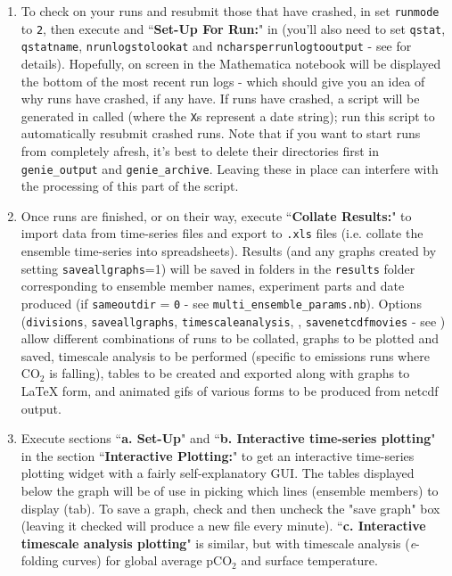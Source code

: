 \documentclass[10pt,a4paper, onecolumn]{article}
\begin{document}
\begin{enumerate}
\item To check on your runs and resubmit those that have crashed, in \texttt{} set \texttt{runmode} to \texttt{2}, then execute \texttt{} and ``\textbf{Set-Up For Run:}" in \texttt{} (you'll also need to set \texttt{qstat}, \texttt{qstatname}, \texttt{nrunlogstolookat} and \texttt{ncharsperrunlogtooutput} - see \texttt{} for details). Hopefully, on screen in the Mathematica notebook will be displayed the bottom of the most recent run logs - which should give you an idea of why runs have crashed, if any have. If runs have crashed, a script will be generated in \texttt{} called \texttt{} (where the \texttt{X}s represent a date string); run this script to automatically resubmit crashed runs. Note that if you want to start runs from completely afresh, it's best to delete their directories first in \texttt{genie\_output} and \texttt{genie\_archive}. Leaving these in place can interfere with the processing of this part of the script.

\item Once runs are finished, or on their way, execute ``\textbf{Collate Results:}"  to import data from time-series files and export to \texttt{.xls} files (i.e. collate the ensemble time-series into spreadsheets). Results (and any graphs created by setting \texttt{saveallgraphs}=1) will be saved in folders in the \texttt{results} folder corresponding to ensemble member names, experiment parts and date produced (if \texttt{sameoutdir} = \texttt{0} - see \texttt{multi\_ensemble\_params.nb}). Options (\texttt{divisions}, \texttt{saveallgraphs}, \texttt{timescaleanalysis}, \texttt{}, \texttt{savenetcdfmovies} - see \texttt{}) allow different combinations of runs to be collated, graphs to be plotted and saved, timescale analysis to be performed (specific to emissions runs where CO$_2$ is falling), tables to be created and exported along with graphs to LaTeX form, and animated gifs of various forms to be produced from netcdf output.

\item Execute sections ``\textbf{a. Set-Up}" and ``\textbf{b. Interactive time-series plotting}" in the section ``\textbf{Interactive Plotting:}" to get an interactive time-series plotting widget with a fairly self-explanatory GUI. The tables displayed below the graph will be of use in picking which lines (ensemble members) to display (tab). To save a graph, check and then uncheck the "save graph" box (leaving it checked will produce a new file every minute). ``\textbf{c. Interactive timescale analysis plotting}" is similar, but with timescale analysis (\textit{e}-folding curves) for global average pCO$_2$ and surface temperature.


\end{enumerate}
\end{document}
